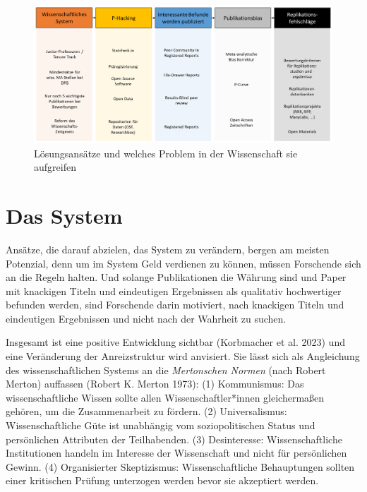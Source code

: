 \documentclass[
  letterpaper,
  DIV=11,
  numbers=noendperiod]{scrreprt}
\begin{document}
\begin{figure}[H]

{\centering \includegraphics{images/lösungsansätze.png}

}

\caption{Lösungsansätze und welches Problem in der Wissenschaft sie
aufgreifen}

\end{figure}%

\section*{}\label{section}

\markright{}

\chapter{Das System}\label{das-system-1}

Ansätze, die darauf abzielen, das System zu verändern, bergen am meisten
Potenzial, denn um im System Geld verdienen zu können, müssen Forschende
sich an die Regeln halten. Und solange Publikationen die Währung sind
und Paper mit knackigen Titeln und eindeutigen Ergebnissen als
qualitativ hochwertiger befunden werden, sind Forschende darin
motiviert, nach knackigen Titeln und eindeutigen Ergebnissen und nicht
nach der Wahrheit zu suchen.

Insgesamt ist eine positive Entwicklung sichtbar (Korbmacher et al.
2023) und eine Veränderung der Anreizstruktur wird anvisiert. Sie lässt
sich als Angleichung des wissenschaftlichen Systems an die
\emph{Mertonschen Normen} (nach Robert Merton) auffassen (Robert K.
Merton 1973): (1) Kommunismus: Das wissenschaftliche Wissen sollte allen
Wissenschaftler*innen gleichermaßen gehören, um die Zusammenarbeit zu
fördern. (2) Universalismus: Wissenschaftliche Güte ist unabhängig vom
soziopolitischen Status und persönlichen Attributen der Teilhabenden.
(3) Desinteresse: Wissenschaftliche Institutionen handeln im Interesse
der Wissenschaft und nicht für persönlichen Gewinn. (4) Organisierter
Skeptizismus: Wissenschaftliche Behauptungen sollten einer kritischen
Prüfung unterzogen werden bevor sie akzeptiert werden.
\end{document}
